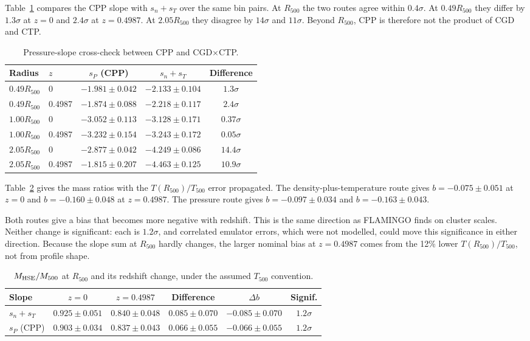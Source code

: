 \documentclass[11pt,a4paper]{article}
\begin{document}
Table~\ref{tab:cpp} compares the CPP slope with $s_n+s_T$ over the same bin pairs. At $R_{500}$ the two routes agree within $0.4\sigma$. At $0.49R_{500}$ they differ by $1.3\sigma$ at $z=0$ and $2.4\sigma$ at $z=0.4987$. At $2.05R_{500}$ they disagree by $14\sigma$ and $11\sigma$. Beyond $R_{500}$, CPP is therefore not the product of CGD and CTP.

\begin{table}
\centering
\begin{tabular}{llccc}
\toprule
Radius & $z$ & $s_P$ (CPP) & $s_n+s_T$ & Difference\\
\midrule
$0.49R_{500}$ & 0 & $-1.981\pm0.042$ & $-2.133\pm0.104$ & $1.3\sigma$\\
$0.49R_{500}$ & 0.4987 & $-1.874\pm0.088$ & $-2.218\pm0.117$ & $2.4\sigma$\\
$1.00R_{500}$ & 0 & $-3.052\pm0.113$ & $-3.128\pm0.171$ & $0.37\sigma$\\
$1.00R_{500}$ & 0.4987 & $-3.232\pm0.154$ & $-3.243\pm0.172$ & $0.05\sigma$\\
$2.05R_{500}$ & 0 & $-2.877\pm0.042$ & $-4.249\pm0.086$ & $14.4\sigma$\\
$2.05R_{500}$ & 0.4987 & $-1.815\pm0.207$ & $-4.463\pm0.125$ & $10.9\sigma$\\
\bottomrule
\end{tabular}
\caption{Pressure-slope cross-check between CPP and CGD$\times$CTP.}
\label{tab:cpp}
\end{table}

Table~\ref{tab:mass} gives the mass ratios with the $T(R_{500})/T_{500}$ error propagated. The density-plus-temperature route gives $b=-0.075\pm0.051$ at $z=0$ and $b=-0.160\pm0.048$ at $z=0.4987$. The pressure route gives $b=-0.097\pm0.034$ and $b=-0.163\pm0.043$.

Both routes give a bias that becomes more negative with redshift. This is the same direction as FLAMINGO finds on cluster scales. Neither change is significant: each is $1.2\sigma$, and correlated emulator errors, which were not modelled, could move this significance in either direction. Because the slope sum at $R_{500}$ hardly changes, the larger nominal bias at $z=0.4987$ comes from the 12\% lower $T(R_{500})/T_{500}$, not from profile shape.

\begin{table}
\centering
\begin{tabular}{lccccc}
\toprule
Slope & $z=0$ & $z=0.4987$ & Difference & $\Delta b$ & Signif.\\
\midrule
$s_n+s_T$ & $0.925\pm0.051$ & $0.840\pm0.048$ & $0.085\pm0.070$ & $-0.085\pm0.070$ & $1.2\sigma$\\
$s_P$ (CPP) & $0.903\pm0.034$ & $0.837\pm0.043$ & $0.066\pm0.055$ & $-0.066\pm0.055$ & $1.2\sigma$\\
\bottomrule
\end{tabular}
\caption{$M_{\rm HSE}/M_{500}$ at $R_{500}$ and its redshift change, under the assumed $T_{500}$ convention.}
\label{tab:mass}
\end{table}
\end{document}
